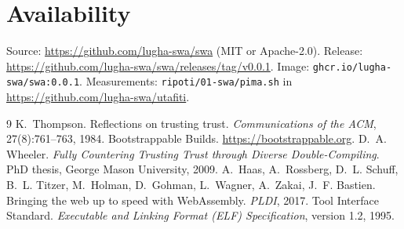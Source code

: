 \documentclass[11pt,a4paper]{article}
\begin{document}
\section*{Availability}

Source: \url{https://github.com/lugha-swa/swa} (MIT or Apache-2.0). Release: \url{https://github.com/lugha-swa/swa/releases/tag/v0.0.1}. Image: \texttt{ghcr.io/lugha-swa/swa:0.0.1}. Measurements: \texttt{ripoti/01-swa/pima.sh} in \url{https://github.com/lugha-swa/utafiti}.

\begin{thebibliography}{9}
 K.~Thompson. Reflections on trusting trust. \emph{Communications of the ACM}, 27(8):761--763, 1984.
 Bootstrappable Builds. \url{https://bootstrappable.org}.
 D.~A. Wheeler. \emph{Fully Countering Trusting Trust through Diverse Double-Compiling}. PhD thesis, George Mason University, 2009.
 A.~Haas, A.~Rossberg, D.~L. Schuff, B.~L. Titzer, M.~Holman, D.~Gohman, L.~Wagner, A.~Zakai, J.~F. Bastien. Bringing the web up to speed with WebAssembly. \emph{PLDI}, 2017.
 Tool Interface Standard. \emph{Executable and Linking Format (ELF) Specification}, version 1.2, 1995.
\end{thebibliography}
\end{document}
